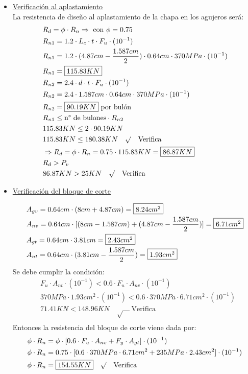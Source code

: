 \begin{enumerate}
\begin{itemize}
\item \underline{Verificación al aplastamiento}\\
La resistencia de diseño al aplastamiento de la chapa en los agujeros será:
\begin{align*}
& R_d = \phi \cdot R_n \Rightarrow \text{ con } \phi = 0.75\\
& R_{n1} = 1.2 \cdot L_c \cdot t \cdot F_u \cdot (10^{-1})\\
& R_{n1} = 1.2 \cdot (4.87cm - \frac{1.587cm}{2}) \cdot 0.64cm \cdot 370MPa \cdot (10^{-1})\\
& R_{n1} = \framebox{$115.83 KN$}\\
& R_{n2} = 2.4 \cdot d \cdot t \cdot F_u \cdot (10^{-1})\\
& R_{n2} = 2.4 \cdot 1.587cm \cdot 0.64cm \cdot 370MPa \cdot (10^{-1})\\
& R_{n2} = \framebox{$90.19 KN$} \text{ por bulón}\\
& R_{n1} \leq \text{n° de bulones} \cdot R_{n2}\\
& 115.83 KN \leq 2 \cdot 90.19 KN\\
& 115.83 KN \leq 180.38 KN \quad \surd \quad \text{Verifica}\\
& \Rightarrow R_d = \phi \cdot R_n = 0.75 \cdot 115.83 KN = \framebox{$86.87 KN$}\\
& R_d > P_v\\
& 86.87 KN > 25 KN \quad \surd \quad \text{Verifica}
\end{align*}
\newpage
\item \underline{Verificación del bloque de corte}

\begin{align*}
& A_{gv} = 0.64cm \cdot (8cm + 4.87cm) = \framebox{$8.24 cm^2$}\\
& A_{nv} = 0.64cm \cdot [(8cm - 1.587cm) + (4.87cm - \frac{1.587cm}{2})] = \framebox{$6.71 cm^2$}\\
& A_{gt} = 0.64cm \cdot 3.81cm = \framebox{$2.43 cm^2$}\\
& A_{nt} = 0.64cm \cdot (3.81cm - \frac{1.587cm}{2}) = \framebox{$1.93 cm^2$}
\end{align*}
Se debe cumplir la condición:
\begin{align*}
& F_u \cdot A_{nt} \cdot (10^{-1}) < 0.6 \cdot F_u \cdot A_{nv} \cdot (10^{-1})\\
& 370MPa \cdot 1.93 cm^2 \cdot (10^{-1}) < 0.6 \cdot 370MPa \cdot 6.71 cm^2 \cdot (10^{-1})\\
& 71.41KN < 148.96KN \quad \surd \quad \text{Verifica}\\
\end{align*}
Entonces la resistencia del bloque de corte viene dada por:
\begin{align*}
& \phi \cdot R_n = \phi \cdot [0.6 \cdot F_u \cdot A_{nv} + F_y \cdot A_{gt}]\cdot (10^{-1})\\
& \phi \cdot R_n = 0.75 \cdot [0.6 \cdot 370MPa \cdot 6.71 cm^2 + 235MPa \cdot 2.43 cm^2]\cdot (10^{-1})\\
& \phi \cdot R_n = \framebox{$154.55 KN$} \quad \surd \quad \text{Verifica}
\end{align*}


\end{itemize}
\end{enumerate}
